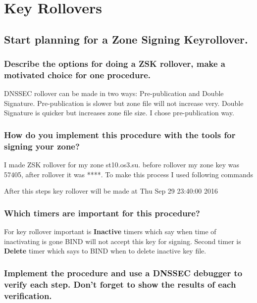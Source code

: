 \documentclass[a4paper,11pt]{article}
\begin{document}
\section{Key Rollovers}
\addtocounter{subsection}{15}
\subsection{Start planning for a Zone Signing Keyrollover.}
\subsubsection{Describe the options for doing a ZSK rollover, make a motivated choice for one procedure.}
DNSSEC rollover can be made in two ways: Pre-publication and Double Signature. Pre-publication is slower but zone file will not increase very. Double Signature is quicker but increases zone file size. I chose pre-publication way.
\subsubsection{How do you implement this procedure with the tools for signing your zone?}
I made ZSK rollover for my zone st10.os3.su. before rollover my zone key was 57405, after rollover it was ****. To make this process I used following commands
After this steps key rollover will be made at Thu Sep 29 23:40:00 2016

\subsubsection{Which timers are important for this procedure?}
For key rollover important is \textbf{Inactive} timers which say when time of inactivating is gone BIND will not accept this key for signing. Second timer is \textbf{Delete} timer which says to BIND when to delete inactive key file.
\subsubsection{Implement the procedure and use a DNSSEC debugger to verify each step. Don’t forget to show the results of each verification.}
\end{document}
